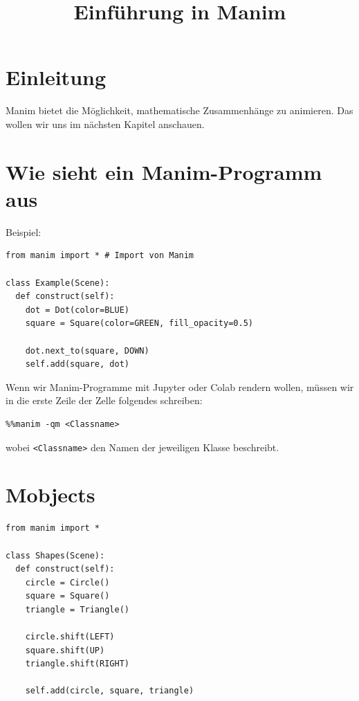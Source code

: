 \documentclass[12pt]{article}
\title{Einführung in Manim}
\author{}
\date{}
\begin{document}
	
	\maketitle
	
	\section*{Einleitung}
	
	Manim bietet die Möglichkeit, mathematische Zusammenhänge zu animieren. Das wollen wir uns im nächsten Kapitel anschauen.
	
	\section{Wie sieht ein Manim-Programm aus}
	
	Beispiel:
	
	\begin{verbatim}
from manim import * # Import von Manim

class Example(Scene):
  def construct(self):
    dot = Dot(color=BLUE)
    square = Square(color=GREEN, fill_opacity=0.5)
    
    dot.next_to(square, DOWN)
    self.add(square, dot)
	\end{verbatim}
	
	Wenn wir Manim-Programme mit Jupyter oder Colab rendern wollen, müssen wir in die erste Zeile der Zelle folgendes schreiben:
	
\begin{verbatim}
%%manim -qm <Classname>
	\end{verbatim}
	
	wobei \verb|<Classname>| den Namen der jeweiligen Klasse beschreibt.
	
	\section{Mobjects}
	
	\begin{verbatim}
from manim import *

class Shapes(Scene):
  def construct(self):
    circle = Circle()
    square = Square()
    triangle = Triangle()

    circle.shift(LEFT)
    square.shift(UP)
    triangle.shift(RIGHT)

    self.add(circle, square, triangle)
	\end{verbatim}
	
\end{document}
